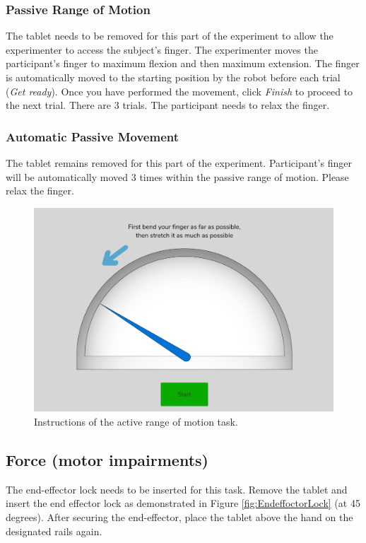 \documentclass[10pt,oneside,a4paper]{article}
\begin{document}
\subsubsection*{Passive Range of Motion}
The tablet needs to be removed for this part of the experiment to allow the experimenter to access the subject’s finger. The experimenter moves the participant’s finger to maximum flexion and then maximum extension. The finger is automatically moved to the starting position by the robot before each trial (\emph{Get ready}). Once you have performed the movement, click \emph{Finish} to proceed to the next trial. There are 3 trials. The participant needs to relax the finger. 

\subsubsection*{Automatic Passive Movement}
The tablet remains removed for this part of the experiment. Participant’s finger will be automatically moved 3 times within the passive range of motion. Please relax the finger. 

\begin{figure}[h!]
\begin{center}
\includegraphics[width=\columnwidth]{images/Assessments/RangeOfMotion.png}
\caption{Instructions of the active range of motion task. }
\label{fig:ROM}
\end{center}
\end{figure}

\subsection{Force (motor impairments)}
The end-effector lock needs to be inserted for this task. Remove the tablet and insert the end effector lock as demonstrated in Figure \ref{fig:EndeffoctorLock} (at 45 degrees). After securing the end-effector, place the tablet above the hand on the designated rails again. \\
\end{document}
